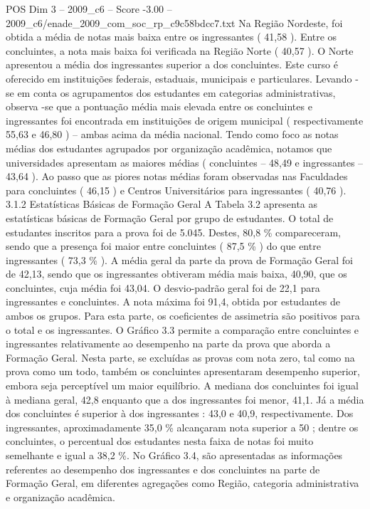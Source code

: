 \begin{textsample}{POS Dim 3 – 2009\_c6 – Score -3.00 – 2009\_c6/enade\_2009\_com\_soc\_rp\_c9c58bdcc7.txt}
Na Região Nordeste, foi obtida a média de notas mais baixa entre os ingressantes ( 41,58 ).
Entre os concluintes, a nota mais baixa foi verificada na Região Norte ( 40,57 ).
O Norte apresentou a média dos ingressantes superior a dos concluintes.
Este curso é oferecido em instituições federais, estaduais, municipais e particulares.
Levando -se em conta os agrupamentos dos estudantes em categorias administrativas, observa -se que a pontuação média mais elevada entre os concluintes e ingressantes foi encontrada em instituições de origem municipal ( respectivamente 55,63 e 46,80 ) – ambas acima da média nacional.
Tendo como foco as notas médias dos estudantes agrupados por organização acadêmica, notamos que universidades apresentam as maiores médias ( concluintes – 48,49 e ingressantes – 43,64 ).
Ao passo que as piores notas médias foram observadas nas Faculdades para concluintes ( 46,15 ) e Centros Universitários para ingressantes ( 40,76 ). 3.1.2 Estatísticas Básicas de Formação Geral A Tabela 3.2 apresenta as estatísticas básicas de Formação Geral por grupo de estudantes.
O total de estudantes inscritos para a prova foi de 5.045.
Destes, 80,8 \% compareceram, sendo que a presença foi maior entre concluintes ( 87,5 \% ) do que entre ingressantes ( 73,3 \% ).
A média geral da parte da prova de Formação Geral foi de 42,13, sendo que os ingressantes obtiveram média mais baixa, 40,90, que os concluintes, cuja média foi 43,04.
O desvio-padrão geral foi de 22,1 para ingressantes e concluintes.
A nota máxima foi 91,4, obtida por estudantes de ambos os grupos.
Para esta parte, os coeficientes de assimetria são positivos para o total e os ingressantes.
O Gráfico 3.3 permite a comparação entre concluintes e ingressantes relativamente ao desempenho na parte da prova que aborda a Formação Geral.
Nesta parte, se excluídas as provas com nota zero, tal como na prova como um todo, também os concluintes apresentaram desempenho superior, embora seja perceptível um maior equilíbrio.
A mediana dos concluintes foi igual à mediana geral, 42,8 enquanto que a dos ingressantes foi menor, 41,1.
Já a média dos concluintes é superior à dos ingressantes : 43,0 e 40,9, respectivamente.
Dos ingressantes, aproximadamente 35,0 \% alcançaram nota superior a 50 ; dentre os concluintes, o percentual dos estudantes nesta faixa de notas foi muito semelhante e igual a 38,2 \%.
No Gráfico 3.4, são apresentadas as informações referentes ao desempenho dos ingressantes e dos concluintes na parte de Formação Geral, em diferentes agregações como Região, categoria administrativa e organização acadêmica.

\end{textsample}
